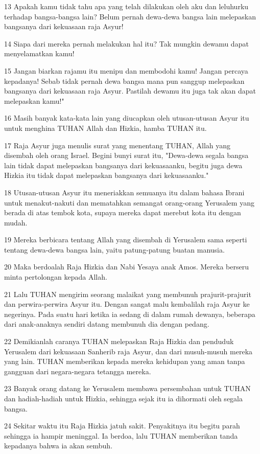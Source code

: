 \par 13 Apakah kamu tidak tahu apa yang telah dilakukan oleh aku dan leluhurku terhadap bangsa-bangsa lain? Belum pernah dewa-dewa bangsa lain melepaskan bangsanya dari kekuasaan raja Asyur!
\par 14 Siapa dari mereka pernah melakukan hal itu? Tak mungkin dewamu dapat menyelamatkan kamu!
\par 15 Jangan biarkan rajamu itu menipu dan membodohi kamu! Jangan percaya kepadanya! Sebab tidak pernah dewa bangsa mana pun sanggup melepaskan bangsanya dari kekuasaan raja Asyur. Pastilah dewamu itu juga tak akan dapat melepaskan kamu!"
\par 16 Masih banyak kata-kata lain yang diucapkan oleh utusan-utusan Asyur itu untuk menghina TUHAN Allah dan Hizkia, hamba TUHAN itu.
\par 17 Raja Asyur juga menulis surat yang menentang TUHAN, Allah yang disembah oleh orang Israel. Begini bunyi surat itu, "Dewa-dewa segala bangsa lain tidak dapat melepaskan bangsanya dari kekuasaanku, begitu juga dewa Hizkia itu tidak dapat melepaskan bangsanya dari kekuasaanku."
\par 18 Utusan-utusan Asyur itu meneriakkan semuanya itu dalam bahasa Ibrani untuk menakut-nakuti dan mematahkan semangat orang-orang Yerusalem yang berada di atas tembok kota, supaya mereka dapat merebut kota itu dengan mudah.
\par 19 Mereka berbicara tentang Allah yang disembah di Yerusalem sama seperti tentang dewa-dewa bangsa lain, yaitu patung-patung buatan manusia.
\par 20 Maka berdoalah Raja Hizkia dan Nabi Yesaya anak Amos. Mereka berseru minta pertolongan kepada Allah.
\par 21 Lalu TUHAN mengirim seorang malaikat yang membunuh prajurit-prajurit dan perwira-perwira Asyur itu. Dengan sangat malu kembalilah raja Asyur ke negerinya. Pada suatu hari ketika ia sedang di dalam rumah dewanya, beberapa dari anak-anaknya sendiri datang membunuh dia dengan pedang.
\par 22 Demikianlah caranya TUHAN melepaskan Raja Hizkia dan penduduk Yerusalem dari kekuasaan Sanherib raja Asyur, dan dari musuh-musuh mereka yang lain. TUHAN memberikan kepada mereka kehidupan yang aman tanpa gangguan dari negara-negara tetangga mereka.
\par 23 Banyak orang datang ke Yerusalem membawa persembahan untuk TUHAN dan hadiah-hadiah untuk Hizkia, sehingga sejak itu ia dihormati oleh segala bangsa.
\par 24 Sekitar waktu itu Raja Hizkia jatuh sakit. Penyakitnya itu begitu parah sehingga ia hampir meninggal. Ia berdoa, lalu TUHAN memberikan tanda kepadanya bahwa ia akan sembuh.
